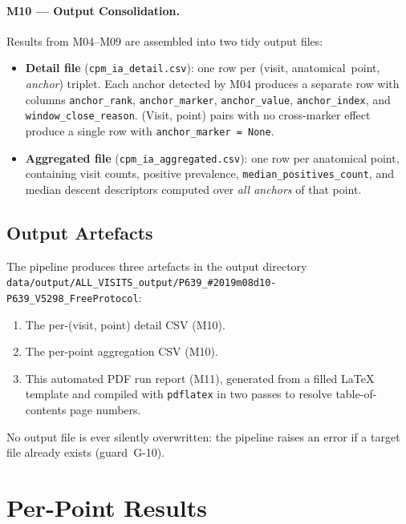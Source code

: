\documentclass[a4paper,11pt]{article}
\begin{document}
\paragraph{M10 --- Output Consolidation.}
Results from M04--M09 are assembled into two tidy output files:
\begin{itemize}
  \item \textbf{Detail file} (\texttt{cpm\_ia\_detail.csv}): one row per
        (visit, anatomical~point, \emph{anchor}) triplet. Each anchor detected by M04
        produces a separate row with columns \texttt{anchor\_rank},
        \texttt{anchor\_marker}, \texttt{anchor\_value}, \texttt{anchor\_index},
        and \texttt{window\_close\_reason}.
        (Visit, point) pairs with no cross-marker effect produce a single row with
        \texttt{anchor\_marker = None}.
  \item \textbf{Aggregated file} (\texttt{cpm\_ia\_aggregated.csv}): one row per
        anatomical point, containing visit counts, positive prevalence,
        \texttt{median\_positives\_count}, and median descent descriptors computed over
        \emph{all anchors} of that point.
\end{itemize}

\subsection{Output Artefacts}

The pipeline produces three artefacts in the output directory \texttt{data/output/ALL\_VISITS\_output/P639\_\#2019m08d10-P639\_V5298\_FreeProtocol}:
\begin{enumerate}
  \item The per-(visit, point) detail CSV (M10).
  \item The per-point aggregation CSV (M10).
  \item This automated PDF run report (M11), generated from a filled \LaTeX{} template
        and compiled with \texttt{pdflatex} in two passes to resolve table-of-contents
        page numbers.
\end{enumerate}
No output file is ever silently overwritten: the pipeline raises an error if a target
file already exists (guard~G-10).

\section{Per-Point Results}
\end{document}
